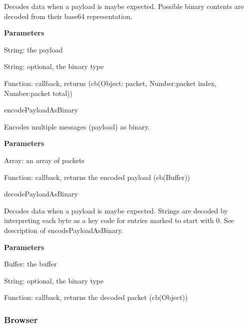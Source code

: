 \begin{DoxyItemize}
\begin{DoxyItemize}
\item Decodes data when a payload is maybe expected. Possible binary contents are decoded from their base64 representation.
\item {\bfseries Parameters}
\begin{DoxyItemize}
\item {\ttfamily String}\+: the payload
\item {\ttfamily String}\+: optional, the binary type
\item {\ttfamily Function}\+: callback, returns (cb({\ttfamily Object}\+: packet, {\ttfamily Number}\+:packet index, {\ttfamily Number}\+:packet total))
\end{DoxyItemize}
\end{DoxyItemize}
\item {\ttfamily encode\+Payload\+As\+Binary}
\begin{DoxyItemize}
\item Encodes multiple messages (payload) as binary.
\item {\bfseries Parameters}
\begin{DoxyItemize}
\item {\ttfamily Array}\+: an array of packets
\item {\ttfamily Function}\+: callback, returns the encoded payload ({\ttfamily cb(\+Buffer)})
\end{DoxyItemize}
\end{DoxyItemize}
\item {\ttfamily decode\+Payload\+As\+Binary}
\begin{DoxyItemize}
\item Decodes data when a payload is maybe expected. Strings are decoded by interpreting each byte as a key code for entries marked to start with 0. See description of encode\+Payload\+As\+Binary.
\item {\bfseries Parameters}
\begin{DoxyItemize}
\item {\ttfamily Buffer}\+: the buffer
\item {\ttfamily String}\+: optional, the binary type
\item {\ttfamily Function}\+: callback, returns the decoded packet ({\ttfamily cb(\+Object)})
\end{DoxyItemize}
\end{DoxyItemize}
\end{DoxyItemize}

\subsubsection*{Browser}


